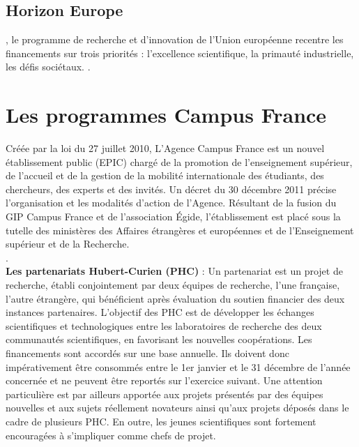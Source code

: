 \subsection{Horizon Europe}

, le programme de recherche et d'innovation de l'Union europ\'eenne 
recentre les financements sur trois priorit\'es : 
l'excellence scientifique, la primaut\'e industrielle, les d\'efis soci\'etaux. 
. \\


\section{Les programmes Campus France}

Cr\'e\'ee par la loi du 27 juillet 2010, L'Agence Campus France est un nouvel \'etablissement public (EPIC) charg\'e de la promotion de l'enseignement sup\'erieur, de l'accueil et de la gestion de la mobilit\'e internationale des \'etudiants, des chercheurs, des experts et des invit\'es. Un d\'ecret du 30 d\'ecembre 2011 pr\'ecise l'organisation et les modalit\'es d'action de l'Agence. R\'esultant de la fusion du GIP Campus France et de l'association \'Egide, l'\'etablissement est plac\'e sous la tutelle des minist\`eres des Affaires \'etrang\`eres et europ\'eennes et de l'Enseignement sup\'erieur et de la Recherche. \\
. \\

\textbf{Les partenariats Hubert-Curien (PHC)} :
\label{PHC}
Un partenariat est un projet de recherche, {\'e}tabli conjointement par deux {\'e}quipes de recherche, l'une fran\c{c}aise, l'autre {\'e}trang{\`e}re, qui b{\'e}n{\'e}ficient apr{\`e}s {\'e}valuation du soutien financier des deux instances partenaires.
L'objectif des PHC est de d{\'e}velopper les {\'e}changes scientifiques et technologiques entre les laboratoires de recherche des deux communaut{\'e}s scientifiques, en favorisant les nouvelles coop{\'e}rations. 
Les financements sont accord\'es sur une base annuelle. Ils doivent donc imp\'erativement \^etre consomm\'es entre le 1er janvier et le 31 d\'ecembre de l'ann\'ee concern\'ee et ne peuvent \^etre report\'es sur l'exercice suivant.
Une attention particuli{\`e}re est par ailleurs apport{\'e}e aux projets pr{\'e}sent{\'e}s par des {\'e}quipes nouvelles et aux sujets r{\'e}ellement novateurs ainsi qu'aux projets d{\'e}pos{\'e}s dans le cadre de plusieurs PHC. En outre, les jeunes scientifiques sont fortement encourag{\'e}\mp e\mp s {\`a} s'impliquer comme chefs de projet.

